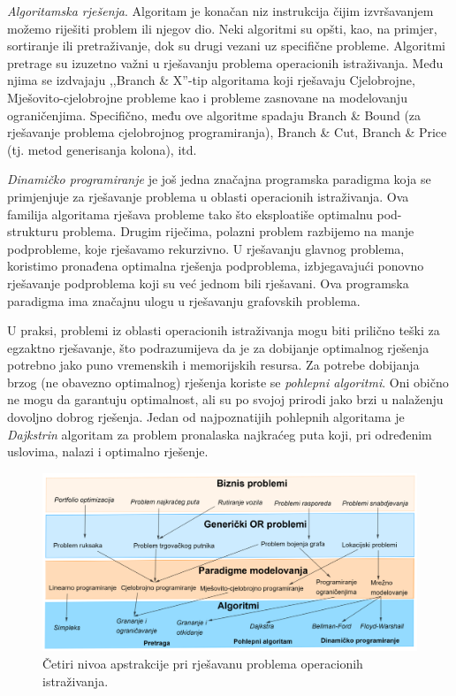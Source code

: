 \documentclass[a4paper, utf8, 11pt, colorlinks]{book}
\theoremstyle{definition}
\begin{document}
 \emph{Algoritamska rješenja}.   Algoritam je konačan niz instrukcija čijim izvršavanjem možemo riješiti problem ili njegov dio. Neki algoritmi su opšti, kao, na primjer, sortiranje ili pretraživanje,  dok su drugi vezani uz specifične probleme. Algoritmi pretrage su izuzetno važni u rješavanju problema operacionih istraživanja. Među njima se izdvajaju ,,Branch \& X''-tip algoritama koji rješavaju Cjelobrojne, Mješovito-cjelobrojne probleme kao i probleme zasnovane na modelovanju ograničenjima. Specifično, među ove algoritme spadaju Branch \& Bound (za rješavanje problema cjelobrojnog programiranja), Branch \& Cut, Branch \& Price (tj. metod generisanja kolona), itd.

\emph{Dinamičko programiranje} je još jedna značajna programska paradigma  koja se primjenjuje za rješavanje problema u oblasti operacionih istraživanja. Ova familija algoritama rješava probleme tako što eksploatiše optimalnu pod-strukturu problema. Drugim riječima, polazni problem razbijemo na manje podprobleme, koje rješavamo rekurzivno. U rješavanju glavnog problema, koristimo pronađena optimalna rješenja podproblema, izbjegavajući ponovno rješavanje podproblema koji su već jednom bili rješavani. Ova programska paradigma ima značajnu ulogu u rješavanju grafovskih problema. 

U praksi, problemi iz oblasti operacionih istraživanja mogu biti prilično teški za egzaktno rješavanje, što podrazumijeva da je za dobijanje optimalnog rješenja potrebno jako puno vremenskih i memorijskih resursa. Za potrebe dobijanja brzog (ne obavezno optimalnog) rješenja  koriste se \emph{pohlepni algoritmi}. Oni obično ne mogu 
da garantuju optimalnost, ali su   po svojoj prirodi jako brzi u nalaženju dovoljno dobrog rješenja. Jedan od najpoznatijih pohlepnih algoritama je \emph{Dajkstrin} algoritam za problem pronalaska najkraćeg puta koji, pri određenim uslovima, nalazi i optimalno rješenje. 

\begin{figure}
    \centering
    \includegraphics[width=\textwidth]{overview.eps}
    \caption{Četiri nivoa apstrakcije pri rješavanu problema operacionih istraživanja.}
    \label{fig:OR_four_levels}
\end{figure}
\end{document}
